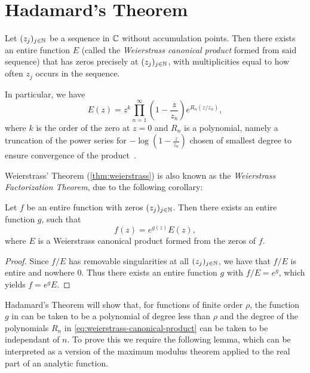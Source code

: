 \section{Hadamard's Theorem}
\label{sec:hadamards-theorem}

\begin{theorem} \label{thm:weierstrass}
    Let $(z_j)_{j \in \mathbb{N}}$ be a sequence in $\mathbb{C}$ without accumulation points. Then there exists an entire function $E$ (called the \emph{Weierstrass canonical product} formed from said sequence) that has zeros precisely at $(z_j)_{j \in \mathbb{N}}$, with multiplicities equal to how often $z_j$ occurs in the sequence.
\end{theorem}

In particular, we have
\begin{equation} \label{eq:weierstrass-canonical-product}
    E(z) = z^k \prod_{n=1}^\infty \left( 1 - \frac{z}{z_n} \right) e^{R_n(z / z_n)},
\end{equation}
where $k$ is the order of the zero at $z = 0$ and $R_n$ is a polynomial, namely a truncation of the power series for $-\log(1 - \frac{z}{z_n})$ chosen of smallest degree to ensure convergence of the product~\cite{segal-complex-analysis}.

Weierstrass' Theorem (\ref{thm:weierstrass}) is also known as the \emph{Weierstrass Factorization Theorem}, due to the following corollary:

\begin{corollary} \label{cor:weierstrass-factorization}
    Let $f$ be an entire function with zeros $(z_j)_{j \in \mathbb{N}}$. Then there exists an entire function $g$, such that
    $$ f(z) = e^{g(z)} E(z), $$
    where $E$ is a Weierstrass canonical product formed from the zeros of $f$.
\end{corollary}

\begin{proof}
    Since $f / E$ has removable singularities at all $(z_j)_{j \in \mathbb{N}}$, we have that $f / E$ is entire and nowhere $0$. Thus there exists an entire function $g$ with $f / E = e^g$, which yields $f = e^g E$.
\end{proof}

Hadamard's Theorem will show that, for functions of finite order $\rho$, the function $g$ in  can be taken to be a polynomial of degree less than $\rho$ and the degree of the polynomials $R_n$ in \cref{eq:weierstrass-canonical-product} can be taken to be independant of $n$. To prove this we require the following lemma, which can be interpreted as a version of the maximum modulus theorem applied to the real part of an analytic function.

